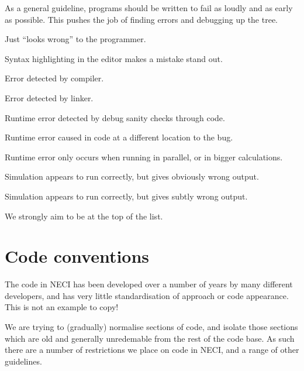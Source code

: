 \documentclass[a4paper,notitlepage]{scrreprt}
\newenvironment{packed_enum}{
	\begin{enumerate}
		\setlength{\itemsep}{1pt}
		\setlength{\parskip}{0pt}
		\setlength{\parsep}{0pt}
	}{\end{enumerate}}
\begin{document}
\begin{mdframed}[ %
	linewidth = 2pt, %
	linecolor = red, %
	roundcorner = 6pt, %
	leftmargin = 10, %
	rightmargin = 10, %
	backgroundcolor = gray!20
]
As a general guideline, programs should be written to fail as loudly and as
early as possible. This pushes the job of finding errors and debugging up
the tree.

\begin{packed_enum}
	\item Just ``looks wrong'' to the programmer.
	\item Syntax highlighting in the editor makes a mistake stand out.
	\item Error detected by compiler.
	\item Error detected by linker.
	\item Runtime error detected by debug sanity checks through code.
	\item Runtime error caused in code at a different location to the bug.
	\item
		Runtime error only occurs when running in parallel, or in bigger
		calculations.
	\item
		Simulation appears to run correctly, but gives obviously wrong output.
	\item
		Simulation appears to run correctly, but gives subtly wrong output.
\end{packed_enum}
We strongly aim to be at the top of the list.
\end{mdframed}

\section{Code conventions}
The code in NECI has been developed over a number of years by many different
developers, and has very little standardisation of approach or code appearance.
This is not an example to copy!

We are trying to (gradually) normalise sections of code, and isolate those
sections which are old and generally unredemable from the rest of the code
base. As such there are a number of restrictions we place on code in NECI,
and a range of other guidelines.
\end{document}
